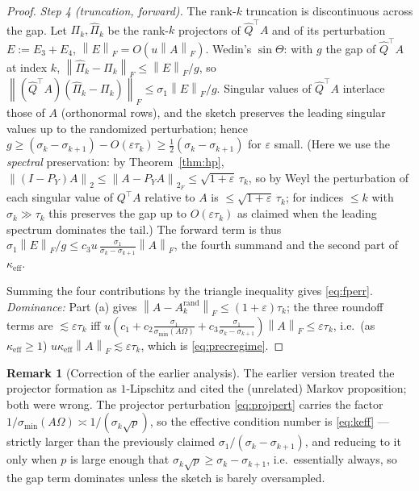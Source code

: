 \documentclass{amsart}
\theoremstyle{definition}
\newtheorem{remark}{Remark}
\newcommand{\Frob}[1]{\left\lVert #1\right\rVert_F}
\newcommand{\Op}[1]{\left\lVert #1\right\rVert_2}
\begin{document}
\begin{proof}
\emph{Step 4 (truncation, forward).} The rank-$k$ truncation is discontinuous
across the gap. Let $\Pi_k,\widehat\Pi_k$ be the rank-$k$ projectors of
$\widehat Q^\top A$ and of its perturbation $E:=E_3+E_4$, $\Frob E=O(u\Frob A)$.
Wedin's $\sin\Theta$: with $g$ the gap of $\widehat Q^\top A$ at index $k$,
$\Frob{\widehat\Pi_k-\Pi_k}\le\Frob E/g$, so
$\Frob{(\widehat Q^\top A)(\widehat\Pi_k-\Pi_k)}\le\sigma_1\Frob E/g$. Singular
values of $\widehat Q^\top A$ interlace those of $A$ (orthonormal rows), and the
sketch preserves the leading singular values up to the randomized perturbation;
hence $g\ge(\sigma_k-\sigma_{k+1})-O(\varepsilon\tau_k)\ge\tfrac12(\sigma_k-\sigma_{k+1})$
for $\varepsilon$ small. (Here we use the \emph{spectral} preservation: by
Theorem~\ref{thm:hp}, $\Op{(I-P_Y)A}\le\Op{A-P_YA}_F\le\sqrt{1+\varepsilon}\,\tau_k$,
so by Weyl the perturbation of each singular value of $Q^\top A$ relative to $A$
is $\le\sqrt{1+\varepsilon}\,\tau_k$; for indices $\le k$ with
$\sigma_k\gg\tau_k$ this preserves the gap up to $O(\varepsilon\tau_k)$ as
claimed when the leading spectrum dominates the tail.) The forward term is thus
$\sigma_1\Frob E/g\le c_3 u\,\frac{\sigma_1}{\sigma_k-\sigma_{k+1}}\Frob A$, the
fourth summand and the second part of $\kappa_{\mathrm{eff}}$.

Summing the four contributions by the triangle inequality gives \eqref{eq:fperr}.
\emph{Dominance:} Part (a) gives $\Frob{A-A_k^{\mathrm{rand}}}\le(1+\varepsilon)\tau_k$;
the three roundoff terms are $\lesssim\varepsilon\tau_k$ iff
$u(c_1+c_2\frac{\sigma_1}{\sigma_{\min}(A\Omega)}+c_3\frac{\sigma_1}{\sigma_k-\sigma_{k+1}})\Frob A
\le\varepsilon\tau_k$, i.e.\ (as $\kappa_{\mathrm{eff}}\ge1$)
$u\kappa_{\mathrm{eff}}\Frob A\lesssim\varepsilon\tau_k$, which is
\eqref{eq:precregime}.
\end{proof}

\begin{remark}[Correction of the earlier analysis]\label{rem:c7c8}
The earlier version treated the projector formation as $1$-Lipschitz and cited
the (unrelated) Markov proposition; both were wrong. The projector perturbation
\eqref{eq:projpert} carries the factor $1/\sigma_{\min}(A\Omega)\asymp
1/(\sigma_k\sqrt p)$, so the effective condition number is \eqref{eq:keff} ---
strictly larger than the previously claimed
$\sigma_1/(\sigma_k-\sigma_{k+1})$, and reducing to it only when $p$ is large
enough that $\sigma_k\sqrt p\ge\sigma_k-\sigma_{k+1}$, i.e.\ essentially always,
so the gap term dominates unless the sketch is barely oversampled.
\end{remark}
\end{document}
